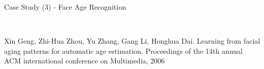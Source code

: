 \documentclass[
 size=14pt,
 paper=smartboard,  %
 mode=present, 		%
 display=slides, 	%
 style=tuliplab,  	%
 pauseslide,
 fleqn,leqno]{powerdot}
\begin{document}
\begin{slide}[toc=,bm=]{Case Study (3) - Face Age Recognition}

\begin{figure}[htbp]
    \\
\end{figure}

\begin{thebibliography}{}
\bibitem{}
\small{Xin Geng, Zhi-Hua Zhou, Yu Zhang, Gang Li, Honghua Dai.
Learning from facial aging patterns for automatic age estimation.
Proceedings of the 14th annual ACM international conference on Multimedia, 2006}
\end{thebibliography}

\end{slide}
\end{document}
